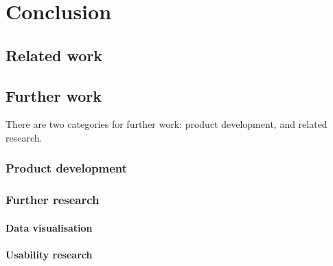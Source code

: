 \chapter{Conclusion}\label{chap:conclusion}





\cite{cummins2014pip-db}
\cite{cummins2014migrating}


\section{Related work}


\section{Further work}

There are two categories for further work: product development, and
related research.

\subsection{Product development}


\subsection{Further research}

\subsubsection*{Data visualisation}

\cite{saraiya2005insight}

\subsubsection*{Usability research}

